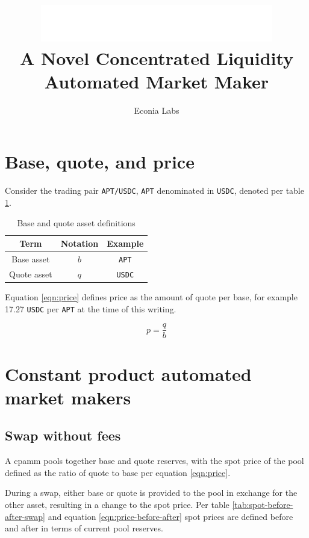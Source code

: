 \documentclass[table, twocolumn]{article}
\title{%
  \includegraphics[width=4in]{../../../../.assets/white-econia-primary-logo.png}\\[10pt]
  A Novel Concentrated Liquidity Automated Market Maker
}
\author{Econia Labs}
\date{}
\begin{document}
\maketitle

\section{Base, quote, and price}

Consider the trading pair \texttt{APT/USDC}, \texttt{APT} denominated in \texttt{USDC},
denoted per table \ref{tab:base-quote-definition}.

\begin{table}[!htb]
  \centering
  \begin{tabular}{|c|c|c|}
    \hline \rowcolor{blue}
    Term        & Notation & Example       \\ \hline
    Base asset  & $b$      & \texttt{APT}  \\ \hline
    Quote asset & $q$      & \texttt{USDC} \\ \hline
  \end{tabular}
  \caption{Base and quote asset definitions}
  \label{tab:base-quote-definition}
\end{table}

Equation \ref{eqn:price} defines price as the amount of quote per base, for example
17.27 \texttt{USDC} per \texttt{APT} at the time of this writing.

\begin{equation} \label{eqn:price}
  p = \frac{q}{b}
\end{equation}

\section{Constant product automated market makers}

\subsection{Swap without fees}

A \gls{cpamm} pools together base and quote reserves, with the spot price of the pool
defined as the ratio of quote to base per equation \ref{eqn:price}.

During a swap, either base or quote is provided to the pool in exchange for the other
asset, resulting in a change to the spot price. Per table
\ref{tab:spot-before-after-swap} and equation \ref{eqn:price-before-after} spot prices
are defined before and after in terms of current pool reserves.
\end{document}
